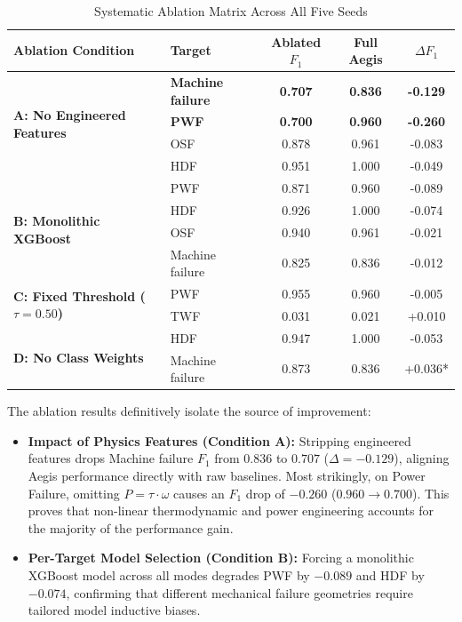 \documentclass[conference]{IEEEtran}
\begin{document}
\begin{table}[h]
\caption{Systematic Ablation Matrix Across All Five Seeds}
\centering
\begin{tabular}{llccc}
\toprule
\textbf{Ablation Condition} & \textbf{Target} & \textbf{Ablated $F_1$} & \textbf{Full Aegis} & \textbf{$\Delta F_1$} \\
\midrule
\multirow{4}{*}{\textbf{A: No Engineered Features}} & \textbf{Machine failure} & \textbf{0.707} & \textbf{0.836} & \textbf{-0.129} \\
 & \textbf{PWF} & \textbf{0.700} & \textbf{0.960} & \textbf{-0.260} \\
 & OSF & 0.878 & 0.961 & -0.083 \\
 & HDF & 0.951 & 1.000 & -0.049 \\
\midrule
\multirow{4}{*}{\textbf{B: Monolithic XGBoost}} & PWF & 0.871 & 0.960 & -0.089 \\
 & HDF & 0.926 & 1.000 & -0.074 \\
 & OSF & 0.940 & 0.961 & -0.021 \\
 & Machine failure & 0.825 & 0.836 & -0.012 \\
\midrule
\multirow{2}{*}{\textbf{C: Fixed Threshold ($\tau = 0.50$)}} & PWF & 0.955 & 0.960 & -0.005 \\
 & TWF & 0.031 & 0.021 & +0.010 \\
\midrule
\multirow{2}{*}{\textbf{D: No Class Weights}} & HDF & 0.947 & 1.000 & -0.053 \\
 & Machine failure & 0.873 & 0.836 & +0.036* \\
\bottomrule
\end{tabular}
\label{tab:ablation}
\end{table}

The ablation results definitively isolate the source of improvement:
\begin{itemize}
    \item \textbf{Impact of Physics Features (Condition A):} Stripping engineered features drops Machine failure $F_1$ from $0.836$ to $0.707$ ($\Delta = -0.129$), aligning Aegis performance directly with raw baselines. Most strikingly, on Power Failure, omitting $P = \tau \cdot \omega$ causes an $F_1$ drop of $\mathbf{-0.260}$ ($0.960 \rightarrow 0.700$). This proves that non-linear thermodynamic and power engineering accounts for the majority of the performance gain.
    \item \textbf{Per-Target Model Selection (Condition B):} Forcing a monolithic XGBoost model across all modes degrades PWF by $-0.089$ and HDF by $-0.074$, confirming that different mechanical failure geometries require tailored model inductive biases.
\end{itemize}
\end{document}
